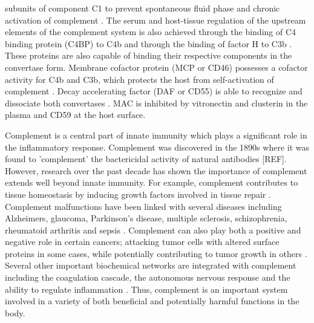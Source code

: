 \documentclass[12pt]{article}
\begin{document}
subunits of component C1 to prevent spontaneous fluid phase and chronic activation of complement \cite{walker1995complement}. The serum and host-tissue regulation of the upstream elements of the complement system is also achieved through the binding of C4 binding protein (C4BP) to C4b and through the binding of factor H to C3b \cite{blom2001structural}. These proteins are also capable of binding their respective components in the convertase form. Membrane cofactor protein (MCP or CD46) possesses a cofactor activity for C4b and C3b, which protects the host from self-activation of complement \cite{riley2004cd46}.  Decay accelerating factor (DAF or CD55) is able to recognize and dissociate both convertases \cite{lukacik2004complement}. MAC is inhibited by vitronectin and clusterin in the plasma and CD59 at the host surface.

Complement is a central part of innate immunity which plays a significant role in the inflammatory response.
Complement was discovered in the 1890s where it was found to 'complement' the bactericidal activity of natural antibodies [REF].
However, research over the past decade has shown the importance of complement extends well beyond innate immunity.
For example, complement contributes to tissue homeostasis by inducing growth factors involved in tissue repair \cite{ricklin2010complement}.
Complement malfunctions have been linked with several diseases including Alzheimers, glaucoma, Parkinson's disease, multiple sclerosis, schizophrenia, rheumatoid arthritis and sepsis \cite{ricklin2007complement, rittirsch2008harmful}.
Complement can also play both a positive and negative role in certain cancers; attacking tumor cells with altered surface proteins in some cases, while potentially contributing to tumor growth in others \cite{sarma2011complement, ricklin2013complement}.
Several other important biochemical networks are integrated with complement including the coagulation cascade, the autonomous nervous response and the ability to regulate inflammation \cite{ricklin2013complement}. Thus, complement is an important system involved in a variety of both beneficial and potentially harmful functions in the body.
\end{document}
